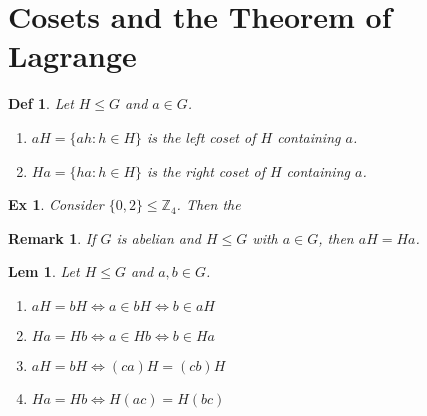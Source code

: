 \documentclass[paper=a4, fontsize=11pt]{scrartcl}
\newtheorem{definition}{Def}
\newtheorem{example}{Ex}
\newtheorem{lemma}{Lem}
\newtheorem*{remark}{Remark}
\begin{document}
\section{Cosets and the Theorem of Lagrange}
\vspace{0.25in}

\begin{definition}
	Let $H\leqslant G$ and $a\in G$.
	\begin{enumerate}[label=\arabic*)]
		\item $aH = \{ah : h\in H\}$ is the left coset of $H$ containing $a$.
		\item $Ha = \{ha : h\in H\}$ is the right coset of $H$ containing $a$.\\
	\end{enumerate}
\end{definition}

\begin{example}
	Consider $\{0,2\} \leqslant \mathbb{Z}_4$. Then the \\
\end{example}

\begin{remark}
	If $G$ is abelian and $H\leqslant G$ with $a \in G$, then $aH=Ha$.\\
\end{remark}

\begin{lemma}
	Let $H\leqslant G$ and $a,b\in G$.
	\begin{enumerate}[label=\arabic*)]
		\item $aH = bH \iff a\in bH \iff b\in aH$
		\item $Ha=Hb \iff a\in Hb \iff b\in Ha$
		\item $aH = bH \iff (ca)H = (cb)H $
		\item $Ha=Hb \iff H(ac)=H(bc)$ \\
	\end{enumerate}
\end{lemma}
\end{document}
